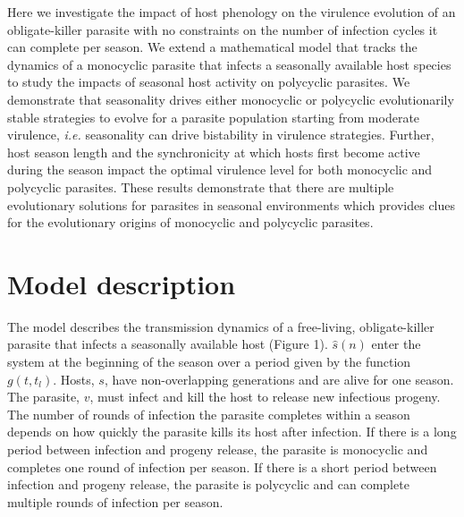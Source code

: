 \documentclass{article}
\begin{document}
Here we investigate the impact of host phenology on the virulence evolution of an obligate-killer parasite with no constraints on the number of infection cycles it can complete per season. We extend a mathematical model that tracks the dynamics of a monocyclic parasite that infects a seasonally available host species to study the impacts of seasonal host activity on polycyclic parasites. We demonstrate that seasonality drives either monocyclic or polycyclic evolutionarily stable strategies to evolve for a parasite population starting from moderate virulence, \textit{i.e.} seasonality can drive bistability in virulence strategies. Further, host season length and the synchronicity at which hosts first become active during the season impact the optimal virulence level for both monocyclic and polycyclic parasites. These results demonstrate that there are multiple evolutionary solutions for parasites in seasonal environments which provides clues for the evolutionary origins of monocyclic and polycyclic parasites.

\section{Model description}
The model describes the transmission dynamics of a free-living, obligate-killer parasite that infects a seasonally available host (Figure 1). $\hat{s}(n)$ enter the system at the beginning of the season over a period given by the function $g(t,t_{l})$. Hosts, $s$, have non-overlapping generations and are alive for one season.
The parasite, $v$, must infect and kill the host to release new infectious progeny. The number of rounds of infection the parasite completes within a season depends on how quickly the parasite kills its host after infection. If there is a long period between infection and progeny release, the parasite is monocyclic and completes one round of infection per season. If there is a short period between infection and progeny release, the parasite is polycyclic and can complete multiple rounds of infection per season.
\end{document}
